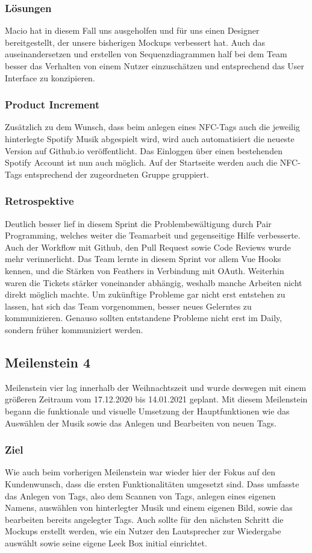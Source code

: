 \documentclass[10pt, a4paper, draft]{article}
\begin{document}
\subsubsection{Lösungen}
Macio hat in diesem Fall uns ausgeholfen und für uns einen Designer bereitgestellt, der unsere bisherigen Mockups verbessert hat.
Auch das auseinandersetzen und erstellen von Sequenzdiagrammen half bei dem Team besser das Verhalten von einem Nutzer einzuschätzen und entsprechend das User Interface zu konzipieren.
\subsubsection{Product Increment}
Zusätzlich zu dem Wunsch, dass beim anlegen eines NFC-Tags auch die jeweilig hinterlegte Spotify Musik abgespielt wird, wird auch automatisiert die neueste Version auf Github.io veröffentlicht.
Das Einloggen über einen bestehenden Spotify Account ist nun auch möglich.
Auf der Startseite werden auch die NFC-Tags entsprechend der zugeordneten Gruppe gruppiert.
\subsubsection{Retrospektive}
Deutlich besser lief in diesem Sprint die Problembewältigung durch Pair Programming, welches weiter die Teamarbeit und gegenseitige Hilfe verbesserte.
Auch der Workflow mit Github, den Pull Request sowie Code Reviews wurde mehr verinnerlicht.
Das Team lernte in diesem Sprint vor allem Vue Hooks kennen, und die Stärken von Feathers in Verbindung mit OAuth.
Weiterhin waren die Tickets stärker voneinander abhängig, weshalb manche Arbeiten nicht direkt möglich machte.
Um zukünftige Probleme gar nicht erst entstehen zu lassen, hat sich das Team vorgenommen, besser neues Gelerntes zu kommunizieren.
Genauso sollten entstandene Probleme nicht erst im Daily, sondern früher kommuniziert werden.

\subsection{Meilenstein 4}
Meilenstein vier lag innerhalb der Weihnachtszeit und wurde deswegen mit einem größeren Zeitraum vom 17.12.2020 bis 14.01.2021 geplant.
Mit diesem Meilenstein begann die funktionale und visuelle Umsetzung der Hauptfunktionen wie das Auswählen der Musik sowie das Anlegen und Bearbeiten von neuen Tags.
\subsubsection{Ziel}
Wie auch beim vorherigen Meilenstein war wieder hier der Fokus auf den Kundenwunsch, dass die ersten Funktionalitäten umgesetzt sind.
Dass umfasste das Anlegen von Tags, also dem Scannen von Tags, anlegen eines eigenen Namens, auswählen von hinterlegter Musik und einem eigenen Bild, sowie das bearbeiten bereits angelegter Tags.
Auch sollte für den nächsten Schritt die Mockups erstellt werden, wie ein Nutzer den Lautsprecher zur Wiedergabe auswählt sowie seine eigene Leek Box initial einrichtet.
\end{document}
